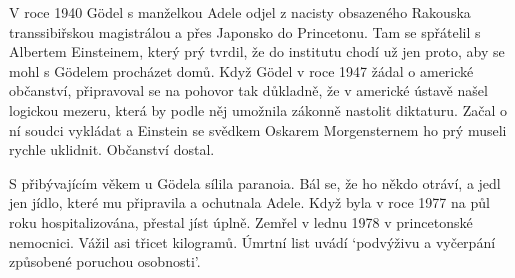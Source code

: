 V roce 1940 Gödel s manželkou Adele odjel z nacisty obsazeného Rakouska transsibiřskou magistrálou a přes Japonsko do Princetonu. Tam se spřátelil s Albertem Einsteinem, který prý tvrdil, že do institutu chodí už jen proto, aby se mohl s Gödelem procházet domů. Když Gödel v roce 1947 žádal o americké občanství, připravoval se na pohovor tak důkladně, že v americké ústavě našel logickou mezeru, která by podle něj umožnila zákonně nastolit diktaturu. Začal o ní soudci vykládat a Einstein se svědkem Oskarem Morgensternem ho prý museli rychle uklidnit. Občanství dostal.

S přibývajícím věkem u Gödela sílila paranoia. Bál se, že ho někdo otráví, a jedl jen jídlo, které mu připravila a ochutnala Adele. Když byla v roce 1977 na půl roku hospitalizována, přestal jíst úplně. Zemřel v lednu 1978 v princetonské nemocnici. Vážil asi třicet kilogramů. Úmrtní list uvádí `podvýživu a vyčerpání způsobené poruchou osobnosti'.
